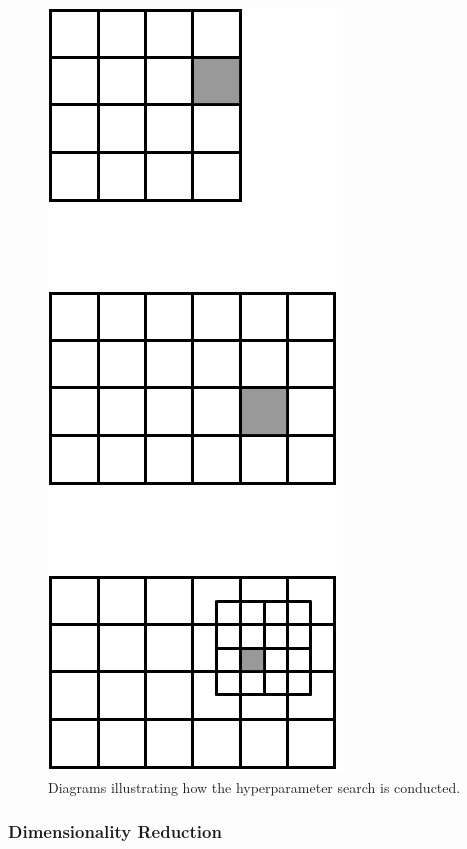 \documentclass[12pt,a4paper,twoside,openright]{report}
\begin{document}
\begin{figure}
	\begin{center}
		\includegraphics[scale=0.4]{figs/gridsearch.jpg}
	\end{center}
	\caption{Diagrams illustrating how the hyperparameter search is conducted.}
	\label{fig:gridsearch}
\end{figure}

\subsubsection{Dimensionality Reduction} \label{impl-reduction}
\end{document}
